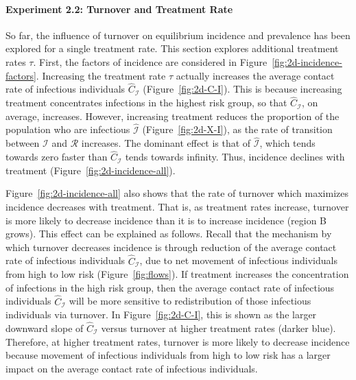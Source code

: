 \paragraph{Experiment 2.2: Turnover and Treatment Rate}
So far, the influence of turnover on equilibrium incidence and prevalence
has been explored for a single treatment rate.
This section explores additional treatment rates $\tau$.
First, the factors of incidence are considered in Figure~\ref{fig:2d-incidence-factors}.
Increasing the treatment rate $\tau$ actually increases
the average contact rate of infectious individuals $\hat{C}_{\mathcal{I}}$
(Figure~\ref{fig:2d-C-I}).
This is because increasing treatment concentrates infections in the highest risk group,
so that $\hat{C}_{\mathcal{I}}$, on average, increases.
However, increasing treatment reduces
the proportion of the population who are infectious $\hat{\mathcal{I}}$
(Figure~\ref{fig:2d-X-I}),
as the rate of transition between $\mathcal{I}$ and $\mathcal{R}$ increases.
The dominant effect is that of $\hat{\mathcal{I}}$,
which tends towards zero faster than $\hat{C}_{\mathcal{I}}$ tends towards infinity.
Thus, incidence declines with treatment
(Figure~\ref{fig:2d-incidence-all}).
\par
Figure~\ref{fig:2d-incidence-all} also shows that
the rate of turnover which maximizes incidence decreases with treatment.
That is, as treatment rates increase,
turnover is more likely to decrease incidence than it is to increase incidence
(region B grows).
This effect can be explained as follows.
Recall that the mechanism by which turnover decreases incidence is through
reduction of the average contact rate of infectious individuals $\hat{C}_{\mathcal{I}}$,
due to net movement of infectious individuals from high to low risk
(Figure~\ref{fig:flows}).
If treatment increases the concentration of infections in the high risk group,
then the average contact rate of infectious individuals $\hat{C}_{\mathcal{I}}$
will be more sensitive to redistribution of those infectious individuals via turnover.
In Figure~\ref{fig:2d-C-I},
this is shown as the larger downward slope of $\hat{C}_{\mathcal{I}}$ versus turnover
at higher treatment rates (darker blue).
Therefore, at higher treatment rates,
turnover is more likely to decrease incidence
because movement of infectious individuals from high to low risk
has a larger impact on the average contact rate of infectious individuals.
